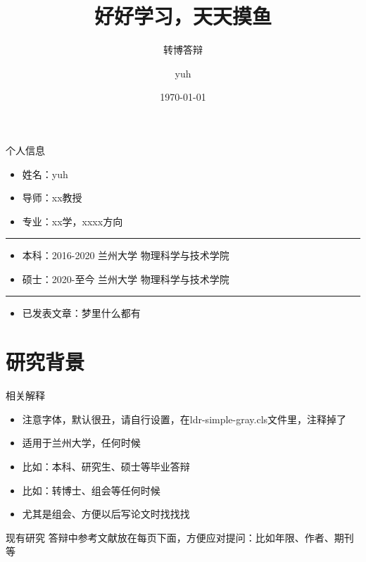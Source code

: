 \documentclass{ldr-simple-gray}
\title{好好学习，天天摸鱼}
\subtitle{转博答辩}
\author{yuh}
\institute[]
{
导师：xx教授\\
兰州大学\quad 物理科学与技术学院
}
\date{\today}
\begin{document}
\frame{\titlepage}


\begin{frame}{个人信息}

    \begin{itemize}
        \item 姓名：yuh
        \item 导师：xx教授
        \item 专业：xx学，xxxx方向
    \end{itemize}

    \qquad \noindent\rule[0.25\baselineskip]{0.9\textwidth}{1pt}

    \begin{itemize}
        \item 本科：2016-2020 \quad 兰州大学 \quad 物理科学与技术学院
        \item 硕士：2020-至今 \quad 兰州大学 \quad 物理科学与技术学院
    \end{itemize}

    \qquad \noindent\rule[0.25\baselineskip]{0.9\textwidth}{1pt}

    \begin{itemize}
        \item 已发表文章：梦里什么都有 ~
    \end{itemize}
\end{frame}


\section{研究背景}

\begin{frame}{相关解释}
    \begin{itemize}
        \item 注意字体，默认很丑，请自行设置，在ldr-simple-gray.cls文件里，注释掉了
        \item 适用于兰州大学，任何时候
        \item 比如：本科、研究生、硕士等毕业答辩
        \item 比如：转博士、组会等任何时候
        \item 尤其是组会、方便以后写论文时找找找
    \end{itemize}
    
\end{frame}


\begin{frame}{现有研究}
    答辩中参考文献放在每页下面，方便应对提问：比如年限、作者、期刊等
    \begin{figure}
         \\
    \end{figure}
\end{frame}
\end{document}
